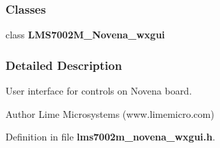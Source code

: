 \subsubsection*{Classes}
\begin{DoxyCompactItemize}
\item 
class {\bf L\+M\+S7002\+M\+\_\+\+Novena\+\_\+wxgui}
\end{DoxyCompactItemize}


\subsubsection{Detailed Description}
User interface for controls on Novena board. 

\begin{DoxyAuthor}{Author}
Lime Microsystems (www.\+limemicro.\+com) 
\end{DoxyAuthor}


Definition in file {\bf lms7002m\+\_\+novena\+\_\+wxgui.\+h}.

